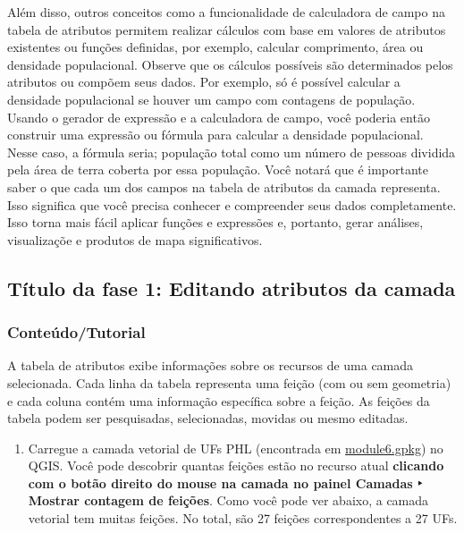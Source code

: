\documentclass[
]{book}
\providecommand{\tightlist}{%
  \setlength{\itemsep}{0pt}\setlength{\parskip}{0pt}}
\begin{document}
Além disso, outros conceitos como a funcionalidade de calculadora de campo na tabela de atributos permitem realizar cálculos com base em valores de atributos existentes ou funções definidas, por exemplo, calcular comprimento, área ou densidade populacional. Observe que os cálculos possíveis são determinados pelos atributos ou compõem seus dados. Por exemplo, só é possível calcular a densidade populacional se houver um campo com contagens de população. Usando o gerador de expressão e a calculadora de campo, você poderia então construir uma expressão ou fórmula para calcular a densidade populacional. Nesse caso, a fórmula seria; população total como um número de pessoas dividida pela área de terra coberta por essa população. Você notará que é importante saber o que cada um dos campos na tabela de atributos da camada representa. Isso significa que você precisa conhecer e compreender seus dados completamente. Isso torna mais fácil aplicar funções e expressões e, portanto, gerar análises, visualizaçõe e produtos de mapa significativos.

\hypertarget{tuxedtulo-da-fase-1-editando-atributos-da-camada}{%
\subsection{Título da fase 1: Editando atributos da camada}\label{tuxedtulo-da-fase-1-editando-atributos-da-camada}}

\hypertarget{conteuxfadotutorial-2}{%
\subsubsection{\texorpdfstring{\textbf{Conteúdo/Tutorial}}{Conteúdo/Tutorial}}\label{conteuxfadotutorial-2}}

A tabela de atributos exibe informações sobre os recursos de uma camada selecionada. Cada linha da tabela representa uma feição (com ou sem geometria) e cada coluna contém uma informação específica sobre a feição. As feições da tabela podem ser pesquisadas, selecionadas, movidas ou mesmo editadas.

\begin{enumerate}
\def\labelenumi{\arabic{enumi}.}
\tightlist
\item
  Carregue a camada vetorial de UFs PHL (encontrada em \href{data/module6.gpkg}{module6.gpkg}) no QGIS. Você pode descobrir quantas feições estão no recurso atual \textbf{clicando com o botão direito do mouse na camada no painel Camadas ‣ Mostrar contagem de feições}. Como você pode ver abaixo, a camada vetorial tem muitas feições. No total, são 27 feições correspondentes a 27 UFs.
\end{enumerate}
\end{document}
